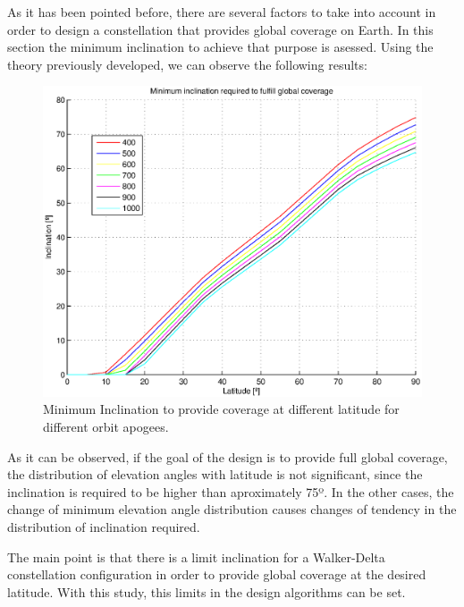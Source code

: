 As it has been pointed before, there are several factors to take into account in order to design a constellation that provides global coverage on Earth. In this section the minimum inclination to achieve that purpose is asessed. Using the theory previously developed, we can observe the following results:

\begin{figure}[H]
	\includegraphics[scale=0.8]{MinimumInclinationPlot}
	\caption[Minimum Inclination to provide coverage at different latitude for different orbit apogees]{Minimum Inclination to provide coverage at different latitude for different orbit apogees.}	
\end{figure}

As it can be observed, if the goal of the design is to provide full global coverage, the distribution of elevation angles with latitude is not significant, since the inclination is required to be higher than aproximately 75º. In the other cases, the change of minimum elevation angle distribution causes changes of tendency in the distribution of inclination required. 

The main point is that there is a limit inclination for a Walker-Delta constellation configuration in order to provide global coverage at the desired latitude. With this study, this limits in the design algorithms can be set.